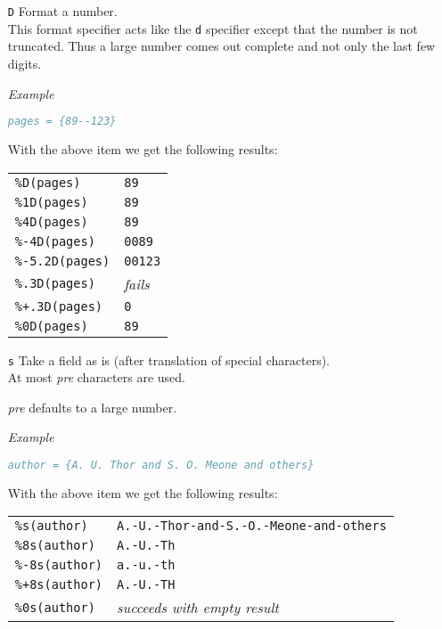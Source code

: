 \documentclass[11pt,a4paper]{scrbook}
\newenvironment{Example}{\smallskip\par\textit{Example}\par}{\smallskip\par}
\begin{document}
\begin{itemize}
  \item [\texttt{D}] Format a number.\\
    This format specifier acts like the \texttt{d} specifier except that the
    number is not truncated. Thus a large number comes out complete and not
    only the last few digits.

    \begin{Example}
      \begin{lstlisting}[language=BibTeX]
  pages = {89--123}
      \end{lstlisting}\vspace{-2ex}
      With the above item we get the following results:
      
      \begin{tabular}{ll}
        \texttt{\%D(pages)}		& \texttt{89}		\\
        \texttt{\%1D(pages)}	& \texttt{89}		\\
        \texttt{\%4D(pages)}	& \texttt{89}		\\
        \texttt{\%-4D(pages)}	& \texttt{0089}		\\
        \texttt{\%-5.2D(pages)}	& \texttt{00123}	\\
        \texttt{\%.3D(pages)}	& \textit{fails}	\\
        \texttt{\%+.3D(pages)}	& \texttt{0}		\\
        \texttt{\%0D(pages)}	& \texttt{89}
      \end{tabular}
    \end{Example}

  \item [\texttt{s}] Take a field as is (after translation of
    special characters).\\ 
    At most \textit{pre} characters are used.

    \textit{pre} defaults to a large number.

    \begin{Example}
      \begin{lstlisting}[language=BibTeX]
  author = {A. U. Thor and S. O. Meone and others}
      \end{lstlisting}\vspace{-2ex}
      With the above item we get the following results:
      
      \begin{tabular}{ll}
        \texttt{\%s(author)}	& \texttt{A.-U.-Thor-and-S.-O.-Meone-and-others}	\\
        \texttt{\%8s(author)}	& \texttt{A.-U.-Th}	\\
        \texttt{\%-8s(author)}	& \texttt{a.-u.-th}	\\
        \texttt{\%+8s(author)}	& \texttt{A.-U.-TH}	\\
        \texttt{\%0s(author)}	& \textit{succeeds with empty result}
      \end{tabular}
    \end{Example}


\end{itemize}
\end{document}
